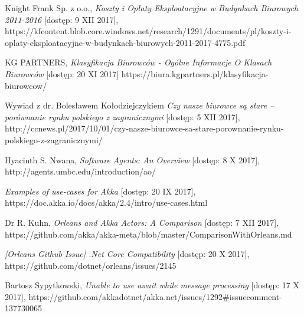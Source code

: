 \begin{thebibliography}{10}%


Knight Frank Sp. z o.o., \emph{Koszty i Opłaty Eksploatacyjne w Budynkach Biurowych 2011-2016} [dostęp: 9 XII 2017],
https://kfcontent.blob.core.windows.net/research/1291/documents/pl/koszty-i-oplaty-eksploatacyjne-w-budynkach-biurowych-2011-2017-4775.pdf

 KG PARTNERS, \emph{Klasyfikacja Biurowców - Ogólne Informacje O Klasach Biurowców} [dostęp: 20 XI 2017]
https://biura.kgpartners.pl/klasyfikacja-biurowcow/

 Wywiad z dr. Bolesławem Kołodziejczykiem \emph{Czy nasze biurowce są stare – porównanie rynku polskiego z zagranicznymi} [dostęp: 5 XII 2017],
http://ccnews.pl/2017/10/01/czy-nasze-biurowce-sa-stare-porownanie-rynku-polskiego-z-zagranicznymi/

 Hyacinth S. Nwana, \emph{Software Agents: An Overview} [dostęp: 8 X 2017],
http://agents.umbc.edu/introduction/ao/

 \emph{Examples of use-cases for Akka} [dostęp: 20 IX 2017],
https://doc.akka.io/docs/akka/2.4/intro/use-cases.html

Dr R. Kuhn, \emph{Orleans and Akka Actors: A Comparison} [dostęp: 7 XII 2017],
https://github.com/akka/akka-meta/blob/master/ComparisonWithOrleans.md

 \emph{[Orleans Github Issue] .Net Core Compatibility} [dostęp: 20 X 2017],
https://github.com/dotnet/orleans/issues/2145

 Bartosz Sypytkowski, \emph{Unable to use await while message processing} [dostęp: 17 X 2017], 
https://github.com/akkadotnet/akka.net/issues/1292\#issuecomment-137730065


\end{thebibliography}